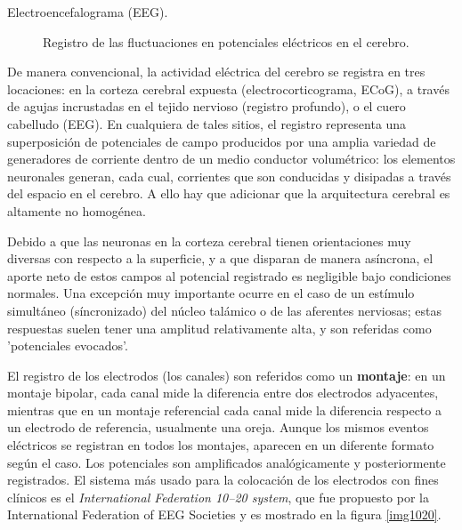 \documentclass[12pt,a4paper]{mitthesis}
\begin{document}
\begin{description}
\item[Electroencefalograma (EEG).] Registro de las fluctuaciones en potenciales el\'ectricos en el 
cerebro.
\end{description}

De manera convencional, la actividad el\'ectrica del cerebro se registra en tres locaciones: en la 
corteza cerebral expuesta (electrocorticograma, ECoG), a trav\'es de agujas incrustadas en el 
tejido nervioso (registro profundo), o el cuero cabelludo (EEG).
En cualquiera de tales sitios, el registro representa una superposici\'on de potenciales de campo 
producidos por una amplia variedad de generadores de corriente dentro de un medio conductor 
volum\'etrico: los elementos neuronales generan, cada cual, corrientes que son conducidas y 
disipadas a trav\'es del espacio en el cerebro.
A ello hay que adicionar que la arquitectura cerebral es altamente no homog\'enea.

Debido a que las neuronas en la corteza cerebral tienen orientaciones muy diversas con respecto a la 
superficie, y a que disparan de manera as\'incrona, el aporte neto de estos campos al potencial 
registrado es negligible bajo condiciones normales.
Una excepci\'on muy importante ocurre en el caso de un est\'imulo simult\'aneo (s\'incronizado)
del n\'ucleo tal\'amico o de las aferentes nerviosas; estas respuestas suelen tener 
una amplitud relativamente alta, y son referidas como 'potenciales evocados'.

El registro de los electrodos (los canales) son referidos como un \textbf{montaje}: en un montaje 
bipolar, cada canal mide la diferencia entre dos electrodos adyacentes, mientras que en un montaje 
referencial cada canal mide la diferencia respecto a un electrodo de referencia, usualmente una 
oreja.
Aunque los mismos eventos el\'ectricos se registran en todos los montajes, aparecen en un diferente 
formato seg\'un el caso. 
Los potenciales son amplificados anal\'ogicamente y posteriormente registrados.
El sistema m\'as usado para la colocaci\'on de los electrodos con fines cl\'inicos es el 
\textit{International Federation 10--20 system}, que fue propuesto por la International Federation 
of EEG Societies \cite{Jasper58,AASM07} y es mostrado en la figura \ref{img1020}. 
\end{document}
